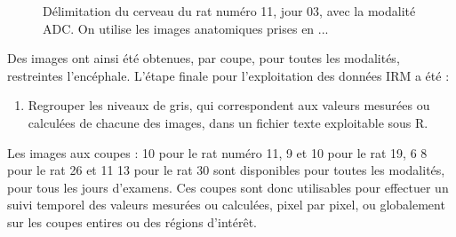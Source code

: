 \setcounter{stock}{\value{enumi}}

\begin{figure}[!h]%
\hfill
{}
\hfill
{}
\hfill
{}
\caption{D\'elimitation du cerveau du rat num\'ero 11, jour 03, avec la modalit\'e ADC. On utilise les images anatomiques prises en ...}%
\label{cephcer}
\end{figure}

\FloatBarrier
Des images ont ainsi \'et\'e obtenues, par coupe, pour toutes les modalit\'es, restreintes  l'enc\'ephale. L'\'etape finale pour l'exploitation des donn\'ees IRM a \'et\'e :
\begin{enumerate}
\setcounter{enumi}{\value{stock}}
\item Regrouper les niveaux de gris, qui correspondent aux valeurs mesur\'ees ou calcul\'ees de chacune des images, dans un fichier texte exploitable sous R.
\end{enumerate}

\etoile
Les images aux coupes : 10 pour le rat num\'ero 11, 9 et 10 pour le rat 19, 6  8 pour le rat 26 et 11  13 pour le rat 30 sont disponibles pour toutes les modalit\'es, %
pour tous les jours d'examens. %
Ces coupes sont donc utilisables pour effectuer un suivi temporel des valeurs mesur\'ees ou calcul\'ees, pixel par pixel, %
ou globalement sur les coupes entires ou des r\'egions d'int\'er\^et.

